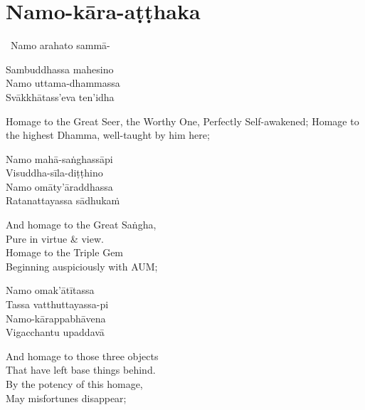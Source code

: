 \suttaRef{[Thai]}

\section{Namo-kāra-aṭṭhaka}
\label{namo-kara-atthaka}

\begin{pali-leader}
  \anglebracketleft\ \hspace{-0.5mm}Namo arahato sammā- \hspace{-0.5mm}\anglebracketright\
\end{pali-leader}
\begin{pali-hangtogether}
  Sambuddhassa mahesino\\
  Namo uttama-dhammassa\\
  Svākkhātass'eva ten'idha
\end{pali-hangtogether}

\begin{english-verses}
  Homage to the Great Seer, the Worthy One, Perfectly Self-awakened; Homage to the highest Dhamma, well-taught by him here;
\end{english-verses}

\begin{pali-hang-continued}
  Namo mahā-saṅghassāpi\\
  Visuddha-sīla-diṭṭhino\\
  Namo omāty'āraddhassa\\
  Ratanattayassa sādhukaṁ
\end{pali-hang-continued}

\begin{english-verses}
  And homage to the Great Saṅgha,\\
  Pure in virtue \& view.\\
  Homage to the Triple Gem\\
  Beginning auspiciously with AUM;
\end{english-verses}

\begin{pali-hang-continued}
  Namo omak'ātītassa\\
  Tassa vatthuttayassa-pi\\
  Namo-kārappabhāvena\\
  Vigacchantu upaddavā\\
\end{pali-hang-continued}

\begin{english-verses}
  And homage to those three objects\\
  That have left base things behind.\\
  By the potency of this homage,\\
  May misfortunes disappear;
\end{english-verses}

